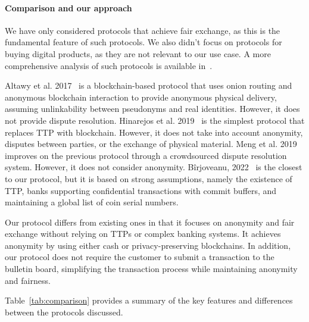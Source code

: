 \documentclass[pdftex,twocolumn,epjc3]{svjour3}
\begin{document}
\paragraph{Comparison and our approach}

\begin{sloppypar}
We have only considered protocols that achieve fair exchange, as this is the fundamental feature of such protocols.
We also didn't focus on protocols for buying digital products, as they are not relevant to our use case. A more comprehensive analysis of such protocols is available in~\cite{birjoveanuTwoPartyECommerceProtocols2022}.
\end{sloppypar}

Altawy et al. 2017~\cite{altawyLelantosBlockchainBasedAnonymous2017} is a blockchain-based protocol that uses onion routing and anonymous blockchain interaction to provide anonymous physical delivery, assuming unlinkability between pseudonyms and real identities. However, it does not provide dispute resolution.
Hinarejos et al. 2019~\cite{hinarejosSolutionSecureCertified2019} is the simplest protocol that replaces TTP with blockchain. However, it does not take into account anonymity, disputes between parties, or the exchange of physical material.
Meng et al. 2019~\cite{mengThemisDecentralizedEscrow2019} improves on the previous protocol through a crowdsourced dispute resolution system. However, it does not consider anonymity.
Bîrjoveanu, 2022~\cite{birjoveanuTwoPartyECommerceProtocols2022} is the closest to our protocol, but it is based on strong assumptions, namely the existence of TTP, banks supporting confidential transactions with commit buffers, and maintaining a global list of coin serial numbers.

Our protocol differs from existing ones in that it focuses on anonymity and fair exchange without relying on TTPs or complex banking systems. It achieves anonymity by using either cash or privacy-preserving blockchains. In addition, our protocol does not require the customer to submit a transaction to the bulletin board, simplifying the transaction process while maintaining anonymity and fairness.

Table~\ref{tab:comparison} provides a summary of the key features and differences between the protocols discussed.
\end{document}
